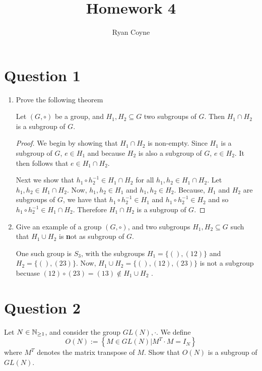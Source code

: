\documentclass[12pt]{article}
\title{Homework 4}
\author{Ryan Coyne}
\begin{document}
\maketitle

\section*{Question 1}
\begin{enumerate}[label=\alph*)]
    \item Prove the following theorem
    \begin{theorem}
        Let \((G, \circ)\) be a group, and \(H_1, H_2\subseteq G\) two subgroups of \(G\). Then \(H_1\cap H_2\) is a subgroup of \(G\).
    \end{theorem}
    \begin{proof}
        We begin by showing that \(H_1\cap H_2\) is non-empty. Since \(H_1\) is a subgroup of \(G\), \(e\in H_1\) and because \(H_2\) is also a subgroup of \(G\), \(e\in H_2\). It then follows that \(e\in H_1\cap H_2\). 
        
        Next we show that \(h_1\circ h_2^{-1}\in H_1\cap H_2\) for all \(h_1, h_2\in H_1\cap H_2\). Let \(h_1, h_2\in H_1 \cap H_2\). Now, \(h_1, h_2\in H_1\) and \(h_1, h_2\in H_2\). Because, \(H_1\) and \(H_2\) are subgroups of \(G\), we have that \(h_1\circ h_2^{-1}\in H_1\) and \(h_1\circ h_2^{-1}\in H_2\) and so \(h_1\circ h_2^{-1}\in H_1\cap H_2\). Therefore \(H_1\cap H_2\) is a subgroup of \(G\).
    \end{proof}
    \item Give an example of a group \((G, \circ)\), and two subgroups \(H_1, H_2\subseteq G\) such that \(H_1 \cup H_2 \) is {\textbf not} as subgroup of \(G\).

    One such group is \(S_3\), with the subgroups \(H_1 = \{(), (12)\}\) and \(H_2 = \{(), (23)\}\). Now, \(H_1\cup H_2 = \{(), (12), (23)\}\) is not a subgroup becuase \((12)\circ (23) = (13) \not\in H_1\cup H_2\) .
\end{enumerate}

\section*{Question 2}
Let \(N\in\mathbb{N}_{\geq 1}\), and consider the group \(GL(N), \cdot\). We define
\begin{equation*}
    O(N) := \left\{ M\in GL(N)| M^T\cdot M = I_N \right\}
\end{equation*}
where \(M^T\) denotes the matrix transpose of \(M\). Show that \(O(N)\) is a subgroup of \(GL(N)\).
\end{document}
